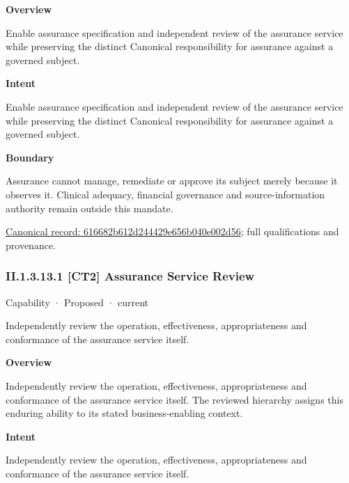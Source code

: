 \textbf{Overview}



Enable assurance specification and independent review of the assurance service while preserving the distinct Canonical responsibility for assurance against a governed subject.



\textbf{Intent}



Enable assurance specification and independent review of the assurance service while preserving the distinct Canonical responsibility for assurance against a governed subject.



\textbf{Boundary}



Assurance cannot manage, remediate or approve its subject merely because it observes it. Clinical adequacy, financial governance and source-information authority remain outside this mandate.


{\footnotesize \href{../../../../continuum/strategy/capability/616682b612d244429e656b040e002d56.md}{Canonical record: 616682b612d244429e656b040e002d56}; full qualifications and provenance.}\par
\subsubsection*{II.1.3.13.1 [CT2] Assurance Service Review}
\label{navigation:II.1.3.13.1}

\label{element:b1a791458d644d4794895e4fa42ec83c}
{\small Capability · Proposed · current}\par

Independently review the operation, effectiveness, appropriateness and conformance of the assurance service itself.



\textbf{Overview}



Independently review the operation, effectiveness, appropriateness and conformance of the assurance service itself. The reviewed hierarchy assigns this enduring ability to its stated business-enabling context.



\textbf{Intent}



Independently review the operation, effectiveness, appropriateness and conformance of the assurance service itself.



